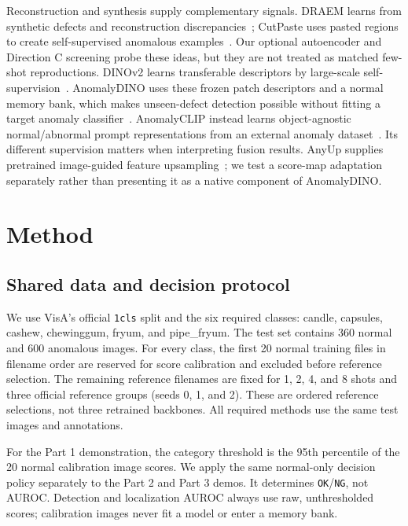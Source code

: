 \documentclass[times,10pt,twocolumn,letterpaper]{article}
\begin{document}
Reconstruction and synthesis supply complementary signals. DRAEM learns from synthetic defects and reconstruction discrepancies~\cite{zavrtanik2021draem}; CutPaste uses pasted regions to create self-supervised anomalous examples~\cite{li2021cutpaste}. Our optional autoencoder and Direction C screening probe these ideas, but they are not treated as matched few-shot reproductions. DINOv2 learns transferable descriptors by large-scale self-supervision~\cite{oquab2024dinov2}. AnomalyDINO uses these frozen patch descriptors and a normal memory bank, which makes unseen-defect detection possible without fitting a target anomaly classifier~\cite{damm2025anomalydino}. AnomalyCLIP instead learns object-agnostic normal/abnormal prompt representations from an external anomaly dataset~\cite{zhou2024anomalyclip}. Its different supervision matters when interpreting fusion results. AnyUp supplies pretrained image-guided feature upsampling~\cite{wimmer2026anyup}; we test a score-map adaptation separately rather than presenting it as a native component of AnomalyDINO.

\section{Method}
\label{sec:method}
\subsection{Shared data and decision protocol}
We use VisA's official \texttt{1cls} split and the six required classes: candle, capsules, cashew, chewinggum, fryum, and pipe\_fryum. The test set contains 360 normal and 600 anomalous images. For every class, the first 20 normal training files in filename order are reserved for score calibration and excluded before reference selection. The remaining reference filenames are fixed for 1, 2, 4, and 8 shots and three official reference groups (seeds 0, 1, and 2). These are ordered reference selections, not three retrained backbones. All required methods use the same test images and annotations.

For the Part 1 demonstration, the category threshold is the 95th percentile of the 20 normal calibration image scores. We apply the same normal-only decision policy separately to the Part 2 and Part 3 demos. It determines \texttt{OK}/\texttt{NG}, not AUROC. Detection and localization AUROC always use raw, unthresholded scores; calibration images never fit a model or enter a memory bank.
\end{document}
